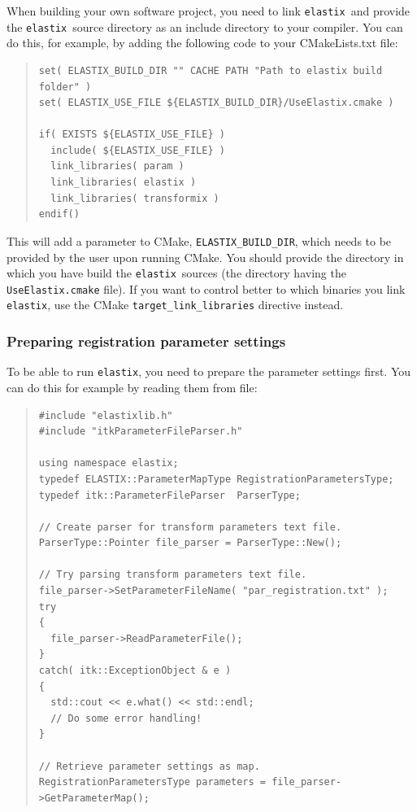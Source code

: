 \documentclass[]{report}
\newcommand{\elastix}{\texttt{elastix}}
\begin{document}
When building your own software project, you need to link \elastix\
and provide the \elastix\ source directory as an include directory
to your compiler. You can do this, for example, by adding the
following code to your CMakeLists.txt file:
\begin{quote}
\begin{verbatim}
set( ELASTIX_BUILD_DIR "" CACHE PATH "Path to elastix build folder" )
set( ELASTIX_USE_FILE ${ELASTIX_BUILD_DIR}/UseElastix.cmake )

if( EXISTS ${ELASTIX_USE_FILE} )
  include( ${ELASTIX_USE_FILE} )
  link_libraries( param )
  link_libraries( elastix )
  link_libraries( transformix )
endif()
\end{verbatim}
\end{quote}

This will add a parameter to CMake, \texttt{ELASTIX\_BUILD\_DIR},
which needs to be provided by the user upon running CMake. You
should provide the directory in which you have build the \elastix\
sources (the directory having the \texttt{UseElastix.cmake} file).
If you want to control better to which binaries you link \elastix,
use the CMake \texttt{target\_link\_libraries} directive instead.


\subsubsection{Preparing registration parameter settings}

To be able to run \elastix, you need to prepare the parameter
settings first. You can do this for example by reading them from
file:
\begin{quote}
\begin{verbatim}
#include "elastixlib.h"
#include "itkParameterFileParser.h"

using namespace elastix;
typedef ELASTIX::ParameterMapType RegistrationParametersType;
typedef itk::ParameterFileParser  ParserType;

// Create parser for transform parameters text file.
ParserType::Pointer file_parser = ParserType::New();

// Try parsing transform parameters text file.
file_parser->SetParameterFileName( "par_registration.txt" );
try
{
  file_parser->ReadParameterFile();
}
catch( itk::ExceptionObject & e )
{
  std::cout << e.what() << std::endl;
  // Do some error handling!
}

// Retrieve parameter settings as map.
RegistrationParametersType parameters = file_parser->GetParameterMap();
\end{verbatim}
\end{quote}
\end{document}
